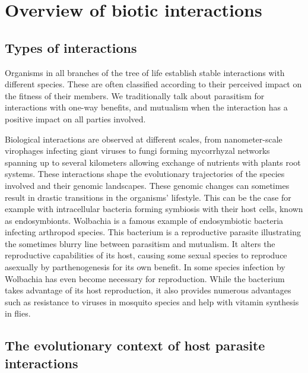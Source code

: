 
\chapter{Overview of biotic interactions} %

\label{ch:01-01} %

\section{Types of interactions}

Organisms in all branches of the tree of life establish stable interactions with different species. These are often classified according to their perceived impact on the fitness of their members. We traditionally talk about parasitism for interactions with one-way benefits, and mutualism when the interaction has a positive impact on all parties involved.

Biological interactions are observed at different scales, from nanometer-scale virophages infecting giant viruses to fungi forming mycorrhyzal networks spanning up to several kilometers allowing exchange of nutrients with plants root systems. These interactions shape the evolutionary trajectories of the species involved and their genomic landscapes. These genomic changes can sometimes result in drastic transitions in the organisms' lifestyle. This can be the case for example with intracellular bacteria forming symbiosis with their host cells, known as endosymbionts. Wolbachia is a famous example of endosymbiotic bacteria infecting arthropod species. This bacterium is a reproductive parasite illustrating the sometimes blurry line between parasitism and mutualism. It alters the reproductive capabilities of its host, causing some sexual species to reproduce asexually by parthenogenesis for its own benefit. In some species infection by Wolbachia has even become necessary for reproduction. While the bacterium takes advantage of its host reproduction, it also provides numerous advantages such as resistance to viruses in mosquito species and help with vitamin synthesis in flies.


\section{The evolutionary context of host parasite interactions}

